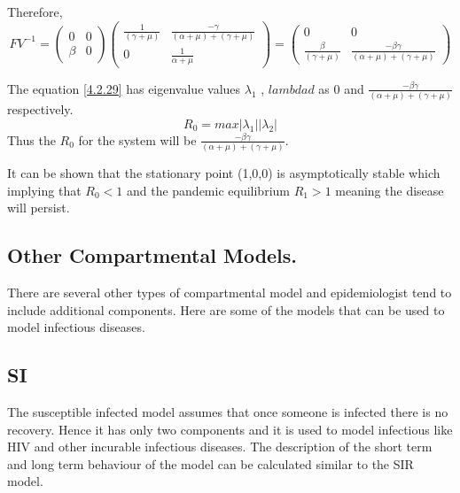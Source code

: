 Therefore,
\begin{equation}\label{4.2.29}
FV^{-1} = \left(\begin{array}{cc} 
0&0 \\ \beta&0
\end{array} \right) \left(\begin{array}{cc}
\frac{1}{(\gamma + \mu)}&  \frac{-\gamma}{(\alpha +\mu)+ (\gamma + \mu)}\\ 0& \frac{1}{\alpha + \mu}  

\end{array} \right) = \left(\begin{array}{cc} 0&0 \\
\frac{\beta}{(\gamma + \mu)} &\frac{- \beta\gamma}{(\alpha +\mu)+ (\gamma + \mu)} 
\end{array}\right)
\end{equation}

The equation \ref{4.2.29} has eigenvalue values $\lambda_1$ , $lambdad$ as 0 and $\frac{- \beta\gamma}{(\alpha +\mu)+ (\gamma + \mu)}$ respectively.
 \begin{equation}
 R_0 = max {|\lambda_1| |\lambda_2|}
 \end{equation}
Thus the $R_0$ for the system will be $\frac{- \beta\gamma}{(\alpha +\mu)+ (\gamma + \mu)}$.

It can be shown that the stationary point (1,0,0) is asymptotically stable which implying that $R_0 <1$ and the pandemic  equilibrium $R_1 >1$ meaning the disease will persist.

\subsection{Other Compartmental Models.}

There are several other types of compartmental model and epidemiologist tend to include additional components. Here are some of the models that can be used to model infectious diseases.

\subsection{SI} The susceptible infected model assumes that once someone is infected there is no recovery. Hence it has only two components and it is used to model infectious like HIV and other incurable infectious diseases. The description of the short term and long term behaviour of the model can be calculated similar to the SIR model.
 

